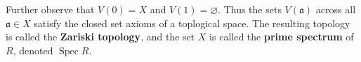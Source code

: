 \documentclass[11pt]{article}
\newcommand{\Spec}{\operatorname{Spec}}
\begin{document}
Further observe that $V(0) = X$ and $V(1) = \varnothing$. Thus the sets $V(\mathfrak{a})$ across all $\mathfrak{a} \in X$ satisfy the closed set axioms of a toplogical space. The resulting topology is called the \textbf{Zariski topology}, and the set $X$ is called the \textbf{prime spectrum} of $R$, denoted $\Spec R$.



\end{document}
